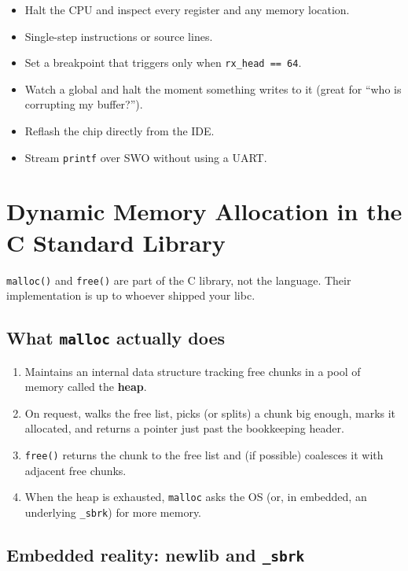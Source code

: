 \documentclass[11pt,a4paper]{article}
\begin{document}
\begin{itemize}[leftmargin=*]
    \item Halt the CPU and inspect every register and any memory location.
    \item Single-step instructions or source lines.
    \item Set a breakpoint that triggers only when \texttt{rx\_head == 64}.
    \item Watch a global and halt the moment something writes to it
    (great for ``who is corrupting my buffer?'').
    \item Reflash the chip directly from the IDE.
    \item Stream \texttt{printf} over SWO without using a UART.
\end{itemize}

\section{Dynamic Memory Allocation in the C Standard Library}

\texttt{malloc()} and \texttt{free()} are part of the C library, not the
language. Their implementation is up to whoever shipped your libc.

\subsection{What \texttt{malloc} actually does}

\begin{enumerate}[leftmargin=*]
    \item Maintains an internal data structure tracking free chunks in a
    pool of memory called the \textbf{heap}.
    \item On request, walks the free list, picks (or splits) a chunk big
    enough, marks it allocated, and returns a pointer just past the
    bookkeeping header.
    \item \texttt{free()} returns the chunk to the free list and (if
    possible) coalesces it with adjacent free chunks.
    \item When the heap is exhausted, \texttt{malloc} asks the OS (or, in
    embedded, an underlying \texttt{\_sbrk}) for more memory.
\end{enumerate}

\subsection{Embedded reality: newlib and \texttt{\_sbrk}}
\end{document}
